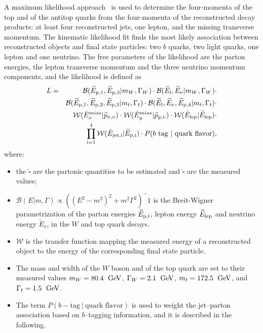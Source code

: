 A maximum likelihood approach~\cite{klfitter} is used to determine the
four-momenta of the top and of the antitop quarks from the four-momenta of
the reconstructed decay products: at least four reconstructed jets, one lepton, and the
missing transverse momentum. The kinematic likelihood fit finds the
most likely association between reconstructed objects and \ttbar{} final state particles:
two $b$ quarks, two light quarks, one lepton and one neutrino.
The free parameters of the likelihood are the parton energies, the
lepton transverse momentum and the three neutrino momentum components,
and the likelihood is defined as
\begin{eqnarray}
L & = & \mathcal{B}(\widetilde{E}_{\rm{p,}1}, \widetilde{E}_{\rm{p,}2} | m_W,  \Gamma_W)
      \cdot \mathcal{B}(\widetilde{E}_{\rm l}, \widetilde{E}_{\nu} | m_W, \Gamma_W) \cdot \nonumber \\
           &   & \mathcal{B}(\widetilde{E}_{\rm{p,}1}, \widetilde{E}_{\rm{p,}2},     \widetilde{E}_{\rm{p,}3} | m_t, \Gamma_t)
                 \cdot \mathcal{B}(\widetilde{E}_{\rm l}, \widetilde{E}_{\nu},    \widetilde{E}_{\rm{p,}4} | m_t, \Gamma_t) \cdot \nonumber \\
           &   & \mathcal{W}( \hat{E}_{x}^{miss}| \widetilde{p}_{x, \nu})
                 \cdot \mathcal{W}(\hat{E}_{y}^{miss} |    \widetilde{p}_{y, \nu})
                 \cdot \mathcal{W}(\hat{E}_{\rm{lep}} | \widetilde{E}_{\rm{lep}}) \cdot \nonumber \\
           &   & \prod_{\rm{i=1}}^4 \mathcal{W}(\hat{E}_{\rm{jet,}i} | \widetilde{E}_{\rm{p,}i})
                 \cdot P(\textrm{$b$ tag} ~| ~\textrm{quark flavor}),
\label{eq:klflikelihood}
\end{eqnarray}
where:
\begin{itemize}
\item the $\widetilde{\square{}}$ are the partonic quantities to be estimated
       and $\hat{\square{}}$ are the measured values;
\item $\mathcal{B}(E|m,\Gamma)\propto((E^2-m^2)^2+m^2\Gamma^2)^-1$ is
  the Breit-Wigner parametrization of the parton energies
  $\widetilde{E}_{\rm{p,}i}$, lepton energy $\widetilde{E}_{\rm{lep}}$
  and neutrino energy $\widetilde{E}_{\nu}$, in the $W$ and top quark decays.
\item $\mathcal{W}$ is the transfer function mapping the measured energy
      of a reconstructed object to the energy of the corresponding final state particle.
\item The mass and width of the $W$ boson and of the top quark are set
  to their measured values $m_W = 80.4~\; \mathrm{GeV}{}$, $\Gamma_W = 2.1~\; \mathrm{GeV}{}$, $m_t =
       172.5~\; \mathrm{GeV}{}$, and $\Gamma_t = 1.5~\; \mathrm{GeV}{}$. 
\item The term $P(b-\textrm{tag} ~| ~\textrm{quark flavor})$ is used
  to weight the jet--parton association based on $b$--tagging
  information, and it is described in the following.
\end{itemize}

